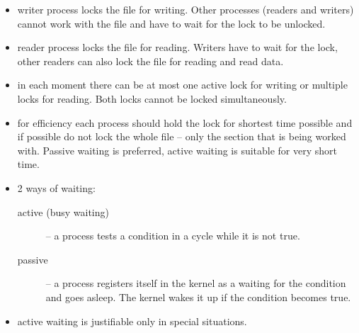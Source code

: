 
\begin{slide}
\begin{itemize}
\item writer process locks the file for writing. Other processes
(readers and writers) cannot work with the file and have to wait for the lock
to be unlocked.
\item reader process locks the file for reading. Writers have to wait
for the lock, other readers can also lock the file for reading and read data.
\item in each moment there can be at most one active lock for writing or
multiple locks for reading. Both locks cannot be locked simultaneously.
\item for efficiency each process should hold the lock for shortest time
possible and if possible do not lock the whole file -- only the section that
is being worked with. Passive waiting is preferred, active waiting is
suitable for very short time.
\end{itemize}
\end{slide}

\begin{itemize}
\item 2 ways of waiting:
\begin{description}
\item[active (busy waiting)] -- a process tests a condition in a cycle while
it is not true.
\item[passive] -- a process registers itself in the kernel as a waiting for
the condition and goes asleep. The kernel wakes it up if the condition becomes
true.
\end{description}
\item {} active waiting is justifiable only in special
situations.
\end{itemize}



